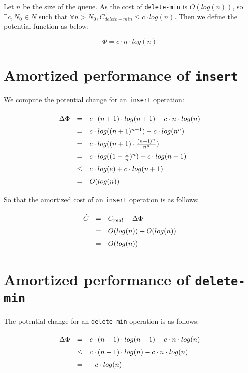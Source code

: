 Let $n$ be the size of the queue. As the cost of \texttt{delete-min} is $O(log(n))$, so $\exists c, N_0 \in N$ such that $\forall n > N_0, C_{delete-min} \leq c \cdot log(n)$. Then we define the potential function as below:

\[
\Phi = c \cdot n \cdot log(n)
\]

\section{Amortized performance of \texttt{insert}}

We compute the potential change for an \texttt{insert} operation:

\[
\def\arraystretch{1.5}
\begin{array}{lcl}
  \Delta \Phi & = & c \cdot (n + 1) \cdot log(n + 1) - c \cdot n \cdot log(n) \\
              & = & c \cdot log((n + 1)^{n + 1}) - c \cdot log(n^n) \\
              & = & c \cdot log((n + 1) \cdot \frac{ (n + 1)^n}{n^n}) \\
              & = & c \cdot log((1 + \frac{1}{n})^n) + c \cdot log(n + 1) \\
              & \leq & c \cdot log(e) + c \cdot log(n + 1) \\
              & = & O(log(n))
\end{array}
\]

So that the amortized cost of an \texttt{insert} operation is as follows:

\[
\def\arraystretch{1.5}
\begin{array}{lcl}
\hat C & = & C_{real} + \Delta \Phi \\
       & = & O(log(n)) + O(log(n)) \\
       & = & O(log(n))
\end{array}
\]

\section{Amortized performance of \texttt{delete-min}}

The potential change for an \texttt{delete-min} operation is as follows:

\[
\def\arraystretch{1.5}
\begin{array}{lcl}
  \Delta \Phi & = & c \cdot (n - 1) \cdot log(n - 1) - c \cdot n \cdot log(n) \\
              & \leq & c \cdot (n - 1) \cdot log(n) - c \cdot n \cdot log(n) \\
              & = & - c \cdot log(n)
\end{array}
\]

